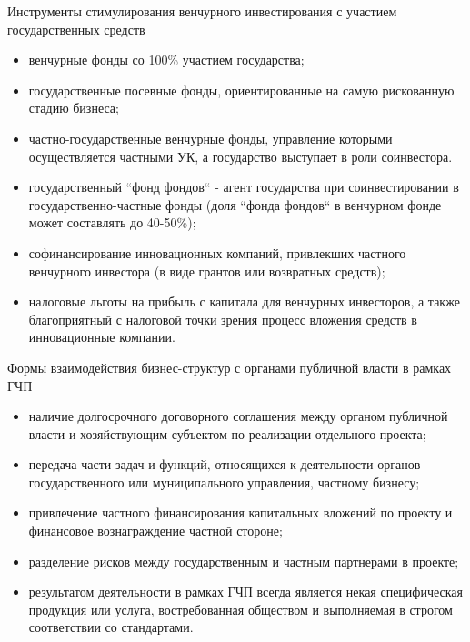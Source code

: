 \documentclass[_Venture_p3.tex]{subfiles}
\begin{document}
\begin{frame}[allowframebreaks]{Инструменты стимулирования венчурного инвестирования}{ с участием государственных средств}
\begin{itemize}
	\item венчурные фонды со 100\% участием государства;
	\item государственные посевные фонды, ориентированные на самую рискованную стадию бизнеса;
	
	\pagebreak
	\item частно-государственные венчурные фонды, управление которыми осуществляется частными УК, а государство выступает в роли соинвестора.
	\item государственный ``фонд фондов`` - агент государства при соинвестировании в государственно-частные фонды (доля ``фонда фондов`` в венчурном фонде может составлять до 40-50\%);

	\pagebreak
	\item софинансирование инновационных компаний, привлекших частного венчурного инвестора (в виде грантов или возвратных средств);
	\item налоговые льготы на прибыль с капитала для венчурных инвесторов, а также благоприятный с налоговой точки зрения процесс вложения средств в инновационные компании.
\end{itemize}
\end{frame}



\begin{frame}[allowframebreaks]{Формы взаимодействия бизнес-структур }{с органами публичной власти в рамках ГЧП}
\begin{itemize}
	\item наличие долгосрочного договорного соглашения между органом публичной власти и хозяйствующим субъектом по реализации отдельного проекта;
	\item передача части задач и функций, относящихся к деятельности органов государственного или муниципального управления, частному бизнесу;
	
	\pagebreak
	\item привлечение частного финансирования капитальных вложений по проекту и финансовое вознаграждение частной стороне;
	\item разделение рисков между государственным и частным партнерами в проекте;

	\pagebreak
	\item результатом деятельности в рамках ГЧП всегда является некая специфическая продукция или услуга, востребованная обществом и выполняемая в строгом соответствии со стандартами.
\end{itemize}
\end{frame}
\end{document}
